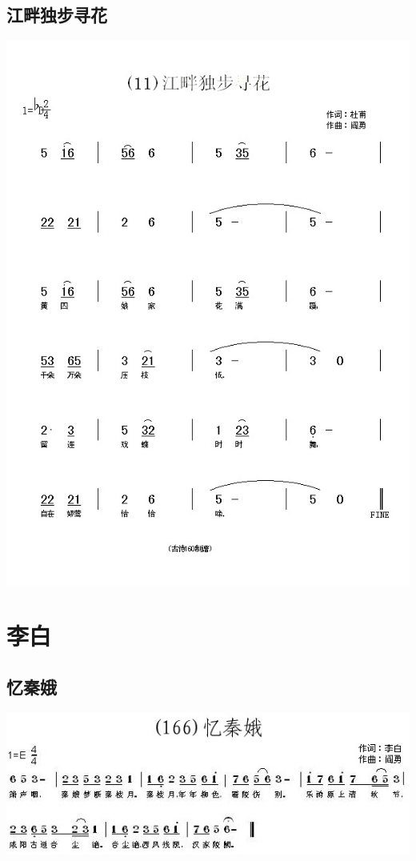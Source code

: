\documentclass[cn,pad,twocol]{elegantbook}
\begin{document}
\section{江畔独步寻花}
    \includegraphics[width=\textwidth]{dongxiao/20200808-江畔独步寻花-杜甫.jpg}   

\chapter{李白}
\section{忆秦娥}
    \includegraphics[width=\textwidth]{dongxiao/20200808-忆秦娥-李白.jpg} 
\end{document}
